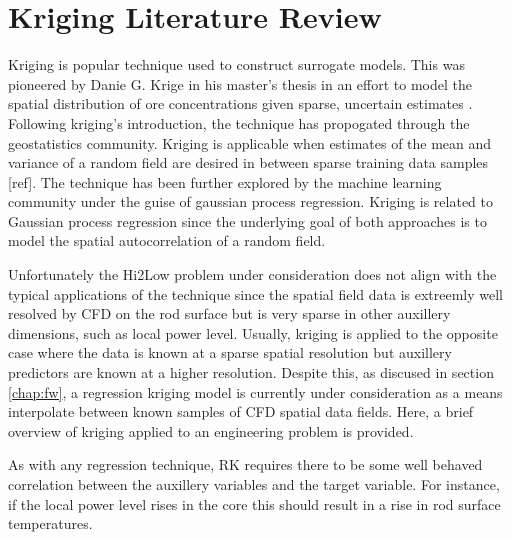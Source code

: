 \section{Kriging Literature Review}

Kriging is popular technique used to construct surrogate models.
This was pioneered by Danie G. Krige in his master's thesis in an effort to model the spatial distribution of ore concentrations given sparse, uncertain estimates \cite{krige51}. Following kriging's introduction, the technique has propogated through the geostatistics community.  Kriging is applicable when estimates of the mean and variance of a random field are desired in between sparse training data samples [ref].  The technique has been further explored by the machine learning community under the guise of gaussian process regression.  Kriging is related to Gaussian process regression since the underlying goal of both approaches is to model the spatial autocorrelation of a random field.  

Unfortunately the Hi2Low problem under consideration does not align with the typical applications of the technique since the spatial field data is extreemly well resolved by CFD on the rod surface but is very sparse in other auxillery dimensions, such as local power level.  Usually, kriging is applied to the opposite case where the data is known at a sparse spatial resolution but auxillery predictors are known at a higher resolution.  Despite this, as discused in section \ref{chap:fw}, a regression kriging model is currently under consideration as a means interpolate between known samples of CFD spatial data fields.  Here, a brief overview of kriging applied to an engineering problem is provided.

As with any regression technique, RK requires there to be some well behaved correlation between the auxillery variables and the target variable.  For instance, if the local power level rises in the core this should result in a rise in rod surface temperatures.


